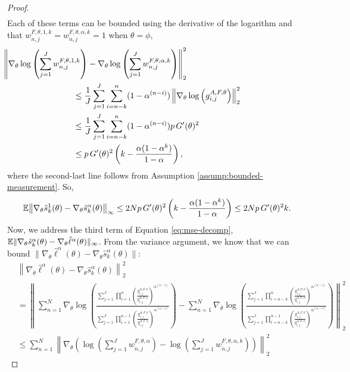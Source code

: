 \begin{proof}
\begin{align}
\end{align}
Each of these terms can be bounded using the derivative of the logarithm and that $w_{n,j}^{F,\theta,1,k} = w_{n,j}^{F,\theta,\alpha,k} = 1$ when $\theta=\phi$,
\begin{align}
    & \hspace{-30mm}
    \left\lVert\nabla_\theta\log\left(\sum_{j=1}^J w_{n,j}^{F,\theta,1,k}\right)-\nabla_\theta\log\left(\sum_{j=1}^J w_{n,j}^{F,\theta,\alpha,k}\right)\right\rVert_{2}^2
    \\
    &\leq \frac{1}{J}\sum_{j=1}^J \sum_{i=n-k}^{n}(1-\alpha^{(n-i)})\left\lVert\nabla_\theta\log\left(g_{i,j}^{A,F,\theta} \right)\right\rVert_2^2
    \\
    &\leq \frac{1}{J}\sum_{j=1}^J \sum_{i=n-k}^{n}(1-\alpha^{(n-i)})p \, G'(\theta)^2
    \\
    &\leq p \, G'(\theta)^2\left(k-\frac{\alpha(1-\alpha^k)}{1-\alpha}\right),
\end{align}
where the second-last line follows from Assumption \ref{assump:bounded-measurement}.
So, 
\begin{align}
    \mathbb{E}\big\|\nabla_\theta\hat s_k^1(\theta) - \nabla_\theta\hat s_k^\alpha(\theta)\big\|_\infty
    \leq 2Np \, G'(\theta)^2\left(k-\frac{\alpha(1-\alpha^k)}{1-\alpha}\right) 
    \leq 2Np \, G'(\theta)^2k.
\end{align}
Now, we address the third term of Equation \ref{eq:mse-decomp}, $\mathbb{E}\|\nabla_\theta\hat s_k^\alpha(\theta) -  \nabla_\theta\hat\ell^\alpha(\theta)\|_\infty$. From the variance argument, we know that we can bound $\|\nabla_\theta\hat\ell^\alpha(\theta) - \nabla_\theta \hat s_k^\alpha(\theta)\|$:
\begin{align}
    &\left\lVert \nabla_\theta\hat\ell^\alpha(\theta) - \nabla_\theta \hat s_k^\alpha(\theta) \right\rVert_2^2
    \\
    &= \left\lVert\sum_{n=1}^N \! \nabla_\theta \log \! \left( \! \frac{\sum_{j=1}^J\prod_{i=1}^n\left(\frac{g_{i,j}^{A,F,\theta}}{g_{i,j}^{A,F,\phi}} \right)^{\alpha^{(n-i)}}}{\sum_{j=1}^J\prod_{i=1}^{n-1}\left(\frac{g_{i,j}^{A,F,\theta}}{g_{i,j}^{A,F,\phi}} \right)^{\alpha^{(n-i)}}}\right) 
    \!-\! 
\sum_{n=1}^N\!\nabla_\theta\log\!\left(\!\frac{\sum_{j=1}^J\prod_{i=n-k}^n\left(\frac{g_{i,j}^{A,F,\theta}}{g_{i,j}^{A,F,\phi}} \right)^{\alpha^{(n-i)}}}{\sum_{j=1}^J\prod_{i=n-k}^{n-1}\left(\frac{g_{i,j}^{A,F,\theta}}{g_{i,j}^{A,F,\phi}} \right)^{\alpha^{(n-i)}}}\right) \! \right\rVert_2^2
    \\ \nonumber
    &\leq \sum_{n=1}^N \left\lVert\nabla_\theta \left(\log\left(\sum_{j=1}^Jw_{n,j}^{F,\theta,\alpha}\right)- \log\!\left(\sum_{j=1}^Jw_{n,j}^{F,\theta,\alpha,k}\right)\right)\right\lVert_2^2

\end{align}
\end{proof}
